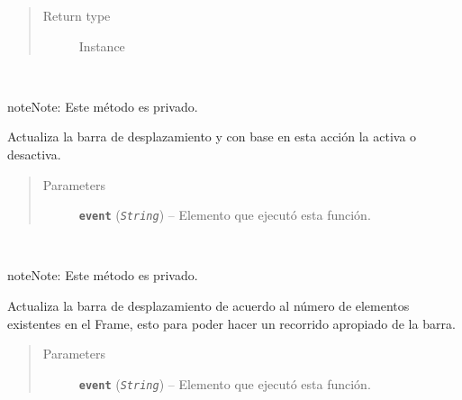 \documentclass[letterpaper,10pt,english]{sphinxmanual}
\begin{document}
\begin{fulllineitems}
\begin{quote}
\begin{description}
\item[{Return type}] \leavevmode
Instance

\end{description}\end{quote}

\begin{fulllineitems}
\label{View/Main/ObjectiveFunction/ObjectiveFunctionFrame:View.Main.ObjectiveFunction.ObjectiveFunctionFrame.ObjectiveFunctionFrame._ObjectiveFunctionFrame__activate_scroll}~
\begin{notice}{note}{Note:}
Este método es privado.
\end{notice}

Actualiza la barra de desplazamiento y con base en esta acción
la activa o desactiva.
\begin{quote}\begin{description}
\item[{Parameters}] \leavevmode
\textbf{\texttt{event}} (\emph{\texttt{String}}) -- Elemento que ejecutó esta función.

\end{description}\end{quote}

\end{fulllineitems}


\begin{fulllineitems}
\label{View/Main/ObjectiveFunction/ObjectiveFunctionFrame:View.Main.ObjectiveFunction.ObjectiveFunctionFrame.ObjectiveFunctionFrame._ObjectiveFunctionFrame__update_scrollbar}~
\begin{notice}{note}{Note:}
Este método es privado.
\end{notice}

Actualiza la barra de desplazamiento de acuerdo al número de elementos
existentes en el Frame, esto para poder hacer un recorrido apropiado de 
la barra.
\begin{quote}\begin{description}
\item[{Parameters}] \leavevmode
\textbf{\texttt{event}} (\emph{\texttt{String}}) -- Elemento que ejecutó esta función.


\end{description}
\end{quote}
\end{fulllineitems}
\end{fulllineitems}
\end{document}
